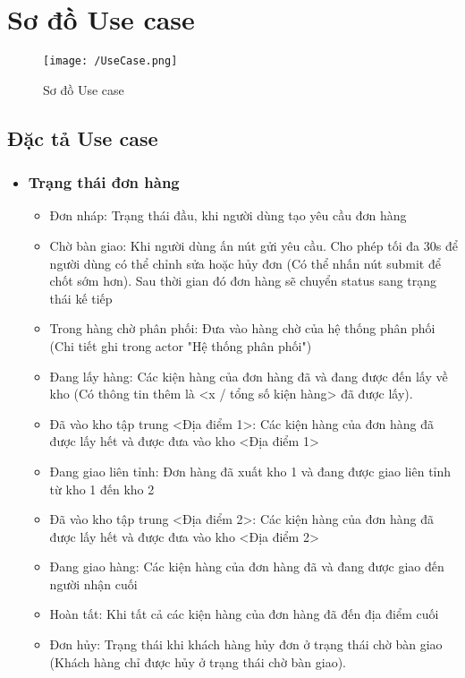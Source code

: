 \newpage
\chapter{Sơ đồ Use case}\label{chap:UC}
\begin{figure}[!ht]
	\texttt{[image: /UseCase.png]}
	\centering
	\linebreak
	\caption{Sơ đồ Use case}
\end{figure}

\newpage

\section{Đặc tả Use case}
\begin{itemize}
	\item 
	\subsection{Trạng thái đơn hàng}
	\begin{itemize}
		\item Đơn nháp: Trạng thái đầu, khi người dùng tạo yêu cầu đơn hàng
		\item Chờ bàn giao: Khi người dùng ấn nút gửi yêu cầu. Cho phép tối đa 30s để người dùng có thể chỉnh sửa hoặc hủy đơn (Có thể nhấn nút submit để chốt sớm hơn). Sau thời gian đó đơn hàng sẽ chuyển status sang trạng thái kế tiếp
		\item Trong hàng chờ phân phối: Đưa vào hàng chờ của hệ thống phân phối (Chi tiết ghi trong actor "Hệ thống phân phối")
		\item Đang lấy hàng: Các kiện hàng của đơn hàng đã và đang được đến lấy về kho (Có thông tin thêm là <x / tổng số kiện hàng> đã được lấy).
		\item Đã vào kho tập trung <Địa điểm 1>: Các kiện hàng của đơn hàng đã được lấy hết và được đưa vào kho <Địa điểm 1> 
		\item Đang giao liên tỉnh: Đơn hàng đã xuất kho 1 và đang được giao liên tỉnh từ kho 1 đến kho 2
		\item Đã vào kho tập trung <Địa điểm 2>: Các kiện hàng của đơn hàng đã được lấy hết và được đưa vào kho <Địa điểm 2>
		\item Đang giao hàng: Các kiện hàng của đơn hàng đã và đang được giao đến người nhận cuối
		\item Hoàn tất: Khi tất cả các kiện hàng của đơn hàng đã đến địa điểm cuối
		\item Đơn hủy: Trạng thái khi khách hàng hủy đơn ở trạng thái chờ bàn giao (Khách hàng chỉ được hủy ở trạng thái chờ bàn giao).
	\end{itemize}

\end{itemize}
